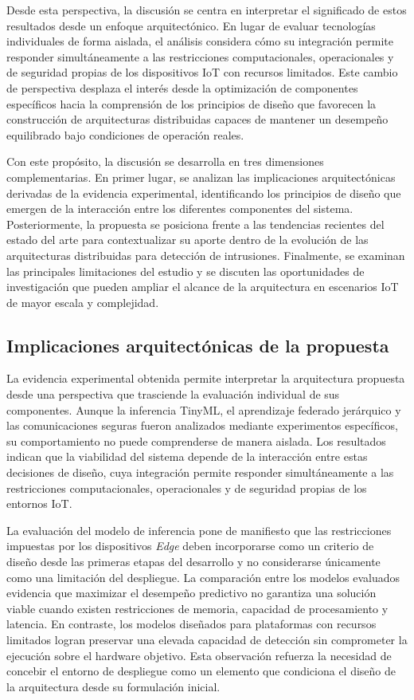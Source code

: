 \documentclass[journal,article,submit,moreauthors]{Definitions/mdpi}
\begin{document}
Desde esta perspectiva, la discusión se centra en interpretar el significado de estos resultados desde un enfoque arquitectónico. En lugar de evaluar tecnologías individuales de forma aislada, el análisis considera cómo su integración permite responder simultáneamente a las restricciones computacionales, operacionales y de seguridad propias de los dispositivos IoT con recursos limitados. Este cambio de perspectiva desplaza el interés desde la optimización de componentes específicos hacia la comprensión de los principios de diseño que favorecen la construcción de arquitecturas distribuidas capaces de mantener un desempeño equilibrado bajo condiciones de operación reales.

Con este propósito, la discusión se desarrolla en tres dimensiones complementarias. En primer lugar, se analizan las implicaciones arquitectónicas derivadas de la evidencia experimental, identificando los principios de diseño que emergen de la interacción entre los diferentes componentes del sistema. Posteriormente, la propuesta se posiciona frente a las tendencias recientes del estado del arte para contextualizar su aporte dentro de la evolución de las arquitecturas distribuidas para detección de intrusiones. Finalmente, se examinan las principales limitaciones del estudio y se discuten las oportunidades de investigación que pueden ampliar el alcance de la arquitectura en escenarios IoT de mayor escala y complejidad.

\subsection{Implicaciones arquitectónicas de la propuesta}
La evidencia experimental obtenida permite interpretar la arquitectura propuesta desde una perspectiva que trasciende la evaluación individual de sus componentes. Aunque la inferencia TinyML, el aprendizaje federado jerárquico y las comunicaciones seguras fueron analizados mediante experimentos específicos, su comportamiento no puede comprenderse de manera aislada. Los resultados indican que la viabilidad del sistema depende de la interacción entre estas decisiones de diseño, cuya integración permite responder simultáneamente a las restricciones computacionales, operacionales y de seguridad propias de los entornos IoT.

La evaluación del modelo de inferencia pone de manifiesto que las restricciones impuestas por los dispositivos \textit{Edge} deben incorporarse como un criterio de diseño desde las primeras etapas del desarrollo y no considerarse únicamente como una limitación del despliegue. La comparación entre los modelos evaluados evidencia que maximizar el desempeño predictivo no garantiza una solución viable cuando existen restricciones de memoria, capacidad de procesamiento y latencia. En contraste, los modelos diseñados para plataformas con recursos limitados logran preservar una elevada capacidad de detección sin comprometer la ejecución sobre el hardware objetivo. Esta observación refuerza la necesidad de concebir el entorno de despliegue como un elemento que condiciona el diseño de la arquitectura desde su formulación inicial.
\end{document}
